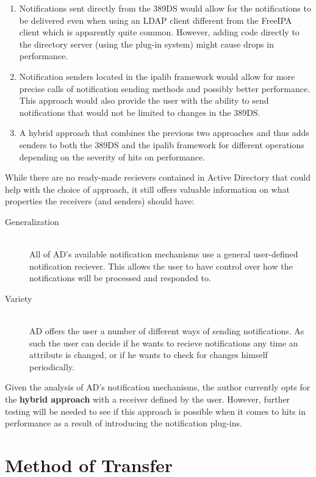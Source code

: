\begin{enumerate}
    \item Notifications sent directly from the 389DS would allow for the notifications to be delivered even when using an LDAP client different from the FreeIPA client which is apparently quite common.
    However, adding code directly to the directory server (using the plug-in system) might cause drops in performance.
    \item Notification senders located in the ipalib framework would allow for more precise calls of notification sending methods and possibly better performance.
    This approach would also provide the user with the ability to send notifications that would not be limited to changes in the 389DS.
    \item A hybrid approach that combines the previous two approaches and thus adds senders to both the 389DS and the ipalib framework for different operations depending on the severity of hits on performance.
\end{enumerate}

While there are no ready-made recievers contained in Active Directory that could help with the choice of approach, it still offers valuable information on what properties the receivers (and senders) should have:

\begin{description}
    \item[Generalization]\hfill \\
        All of AD's available notification mechanisms use a general user-defined notification reciever.
        This allows the user to have control over how the notifications will be processed and responded to.
    \item[Variety]\hfill \\
        AD offers the user a number of different ways of sending notifications. As such the user can decide if he wants to recieve notifications any time an attribute is changed,
        or if he wants to check for changes himself periodically.
\end{description}

Given the analysis of AD's notification mechanisms, the author currently opts for the \textbf{hybrid approach} with a receiver defined by the user.
However, further testing will be needed to see if this approach is possible when it comes to hits in performance as a result of introducing the notification plug-ins.

\section{Method of Transfer}

